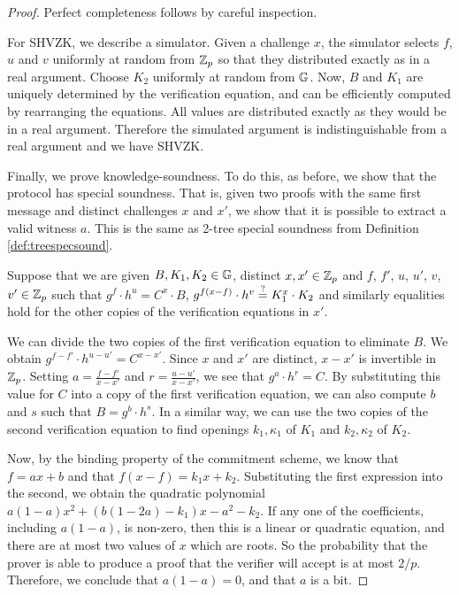\begin{proof} Perfect completeness follows by careful inspection.

For SHVZK, we describe a simulator. Given a challenge $x$, the simulator selects $f$, $u$ and $v$ uniformly at random from $\mathbb{Z}_p$ so that they distributed exactly as in a real argument. Choose $K_2$ uniformly at random from $\mathbb{G}$. Now, $B$ and $K_1$ are uniquely determined by the verification equation, and can be efficiently computed by rearranging the equations. All values are distributed exactly as they would be in a real argument. Therefore the simulated argument is indistinguishable from a real argument and we have SHVZK.

Finally, we prove knowledge-soundness. To do this, as before, we show that the protocol has special soundness. That is, given two proofs with the same first message and distinct challenges $x$ and $x'$, we show that it is possible to extract a valid witness $a$. This is the same as 2-tree special soundness from Definition \ref{def:treespecsound}.

Suppose that we are given $B,K_1,K_2 \in \mathbb{G}$, distinct $x,x' \in \mathbb{Z}_p$ and $f$, $f'$, $u$, $u'$, $v$, $v'
 \in \mathbb{Z}_p$ such that $g^f \cdot h^u = C^x \cdot B$, $g^{f(x-f)} \cdot h^v \overset{?}{=} K_1^x \cdot K_2$ and similarly equalities hold for the other copies of the verification equations in $x'$. 

We can divide the two copies of the first verification equation to eliminate $B$. We obtain $g^{f-f'}  \cdot h^{u-u'}= C^{x-x'}$. Since $x$ and $x'$ are distinct, $x-x'$ is invertible in $\mathbb{Z}_p$. Setting $a = \frac{f-f'}{x-x'}$ and $r = \frac{u-u'}{x-x'}$, we see that $g^a \cdot h^r = C$. By substituting this value for $C$ into a copy of the first verification equation, we can also compute $b$ and $s$ such that $B = g^b \cdot h^s$. In a similar way, we can use the two copies of the second verification equation to find openings $k_1,\kappa_1$ of $K_1$ and $k_2,\kappa_2$ of $K_2$.

Now, by the binding property of the commitment scheme, we know that $f = ax+b$ and that $f(x-f) = k_1 x + k_2$. Substituting the first expression into the second, we obtain the quadratic polynomial $a(1-a)x^2 + (b(1-2a)-k_1)x-a^2-k_2$. If any one of the coefficients, including $a(1-a)$, is non-zero, then this is a linear or quadratic equation, and there are at most two values of $x$ which are roots. So the probability that the prover is able to produce a proof that the verifier will accept is at most $2/p$. Therefore, we conclude that $a(1-a) = 0$, and that $a$ is a bit.


\end{proof}
